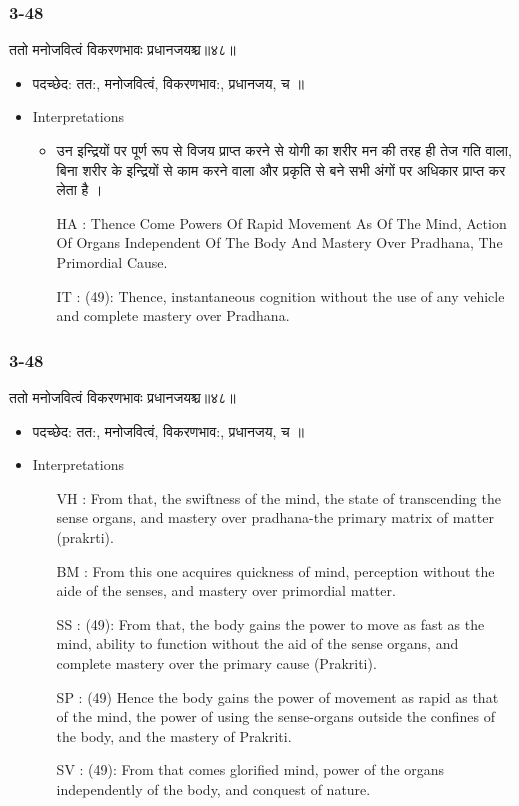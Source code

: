 \begin{frame}[fragile]\frametitle{3-48}
\begin{sanskrit}
ततो मनोजवित्वं विकरणभावः प्रधानजयश्च॥४८॥
\end{sanskrit}

	\begin{itemize}
	\item पदच्छेद:  तत:, मनोजवित्वं, विकरणभाव:, प्रधानजय, च ॥
	\item Interpretations
		\begin{itemize}	
		\item  उन इन्द्रियों पर पूर्ण रूप से विजय प्राप्त करने से योगी का शरीर मन की तरह ही तेज गति वाला, बिना शरीर के इन्द्रियों से काम करने वाला और प्रकृति से बने सभी अंगों पर अधिकार प्राप्त कर लेता है ।
		\item [HA]: Thence Come Powers Of Rapid Movement As Of The Mind, Action Of Organs Independent Of The Body And Mastery Over Pradhana, The Primordial Cause.
		\item [IT]: (49): Thence, instantaneous cognition without the use of any vehicle and complete mastery over Pradhana.
		\end{itemize}
	\end{itemize}
\end{frame}

\begin{frame}[fragile]\frametitle{3-48}
\begin{sanskrit}
ततो मनोजवित्वं विकरणभावः प्रधानजयश्च॥४८॥
\end{sanskrit}

	\begin{itemize}
	\item पदच्छेद:  तत:, मनोजवित्वं, विकरणभाव:, प्रधानजय, च ॥
	\item Interpretations
		\begin{itemize}	
		\item [VH]: From that, the swiftness of the mind, the state of transcending the sense organs, and mastery over pradhana-the primary matrix of matter (prakrti).
		\item [BM]: From this one acquires quickness of mind, perception without the aide of the senses, and mastery over primordial matter.
		\item [SS]: (49): From that, the body gains the power to move as fast as the mind, ability to function without the aid of the sense organs, and complete mastery over the primary cause (Prakriti).
		\item [SP]: (49) Hence the body gains the power of movement as rapid as that of the mind, the power of using the sense-organs outside the confines of the body, and the mastery of Prakriti.
		\item [SV]: (49): From that comes glorified mind, power of the organs independently of the body, and conquest of nature. 
		\end{itemize}
	\end{itemize}
\end{frame}


